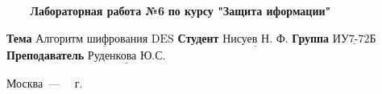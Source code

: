 \begin{titlepage}
	
	\begin{center}
		\noindent\begin{minipage}{1.3\textwidth}\centering
		\Large\textbf{   ~~~ Лабораторная работа №6}\newline
		\textbf{по курсу "Защита иформации"}\newline\newline\newline\newline
		\end{minipage}
	\end{center}
	
	\noindent\textbf{Тема} 			$\underline{\text{Алгоритм шифрования DES}}$\newline\newline
	\noindent\textbf{Студент} 		$\underline{\text{Нисуев Н. Ф.}}$\newline\newline
	\noindent\textbf{Группа} 		$\underline{\text{ИУ7-72Б}}$\newline\newline
	\noindent\textbf{Преподаватель} $\underline{\text{Руденкова Ю.С.}}$\newline
	
	\begin{center}
		\vfill
		Москва~---~\the\year
		~г.
	\end{center}
	\restoregeometry
\end{titlepage}